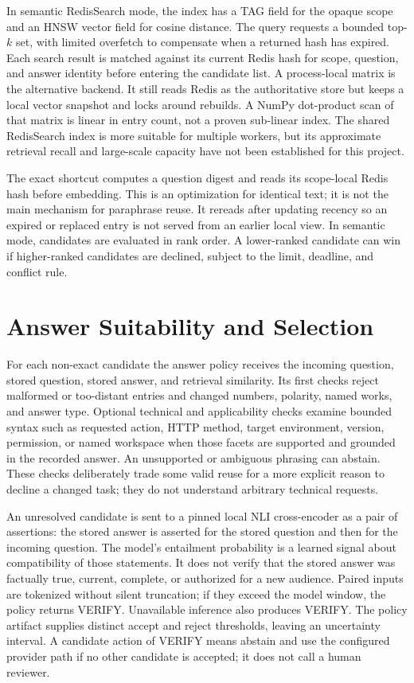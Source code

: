 In semantic RedisSearch mode, the index has a TAG field for the opaque scope and an HNSW vector field for cosine distance. The query requests a bounded top-$k$ set, with limited overfetch to compensate when a returned hash has expired. Each search result is matched against its current Redis hash for scope, question, and answer identity before entering the candidate list. A process-local matrix is the alternative backend. It still reads Redis as the authoritative store but keeps a local vector snapshot and locks around rebuilds. A NumPy dot-product scan of that matrix is linear in entry count, not a proven sub-linear index. The shared RedisSearch index is more suitable for multiple workers, but its approximate retrieval recall and large-scale capacity have not been established for this project.

The exact shortcut computes a question digest and reads its scope-local Redis hash before embedding. This is an optimization for identical text; it is not the main mechanism for paraphrase reuse. It rereads after updating recency so an expired or replaced entry is not served from an earlier local view. In semantic mode, candidates are evaluated in rank order. A lower-ranked candidate can win if higher-ranked candidates are declined, subject to the limit, deadline, and conflict rule.

\section{Answer Suitability and Selection}
For each non-exact candidate the answer policy receives the incoming question, stored question, stored answer, and retrieval similarity. Its first checks reject malformed or too-distant entries and changed numbers, polarity, named works, and answer type. Optional technical and applicability checks examine bounded syntax such as requested action, HTTP method, target environment, version, permission, or named workspace when those facets are supported and grounded in the recorded answer. An unsupported or ambiguous phrasing can abstain. These checks deliberately trade some valid reuse for a more explicit reason to decline a changed task; they do not understand arbitrary technical requests.

An unresolved candidate is sent to a pinned local NLI cross-encoder as a pair of assertions: the stored answer is asserted for the stored question and then for the incoming question. The model's entailment probability is a learned signal about compatibility of those statements. It does not verify that the stored answer was factually true, current, complete, or authorized for a new audience. Paired inputs are tokenized without silent truncation; if they exceed the model window, the policy returns VERIFY. Unavailable inference also produces VERIFY. The policy artifact supplies distinct accept and reject thresholds, leaving an uncertainty interval. A candidate action of VERIFY means abstain and use the configured provider path if no other candidate is accepted; it does not call a human reviewer.

